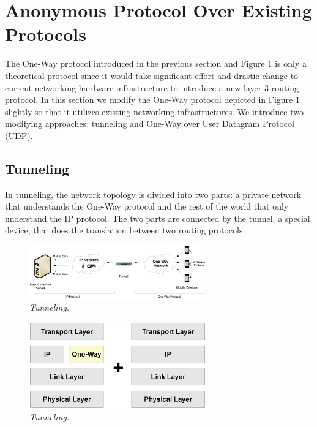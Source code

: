\section{Anonymous Protocol Over Existing Protocols}\label{sec-protocol}
The One-Way protocol introduced in the previous section and Figure 1 is only
a theoretical protocol since it would take significant effort and drastic
change to current networking hardware infrastructure to introduce a new layer 3
routing protocol. In this section we modify the One-Way protocol depicted in
Figure 1 slightly so that it utilizes existing networking infrastructures. We
introduce two modifying approaches: tunneling and One-Way over User Datagram
Protocol (UDP).

\subsection{Tunneling}

In tunneling, the network topology is divided into two parts: a private
network that understands the One-Way protocol and the rest of the world that
only understand the IP protocol. The two parts are connected by the tunnel,
a special device, that does the translation between two routing protocols.

\begin{figure}[h]
\begin{center}
\includegraphics[width=3in]{figure2.eps}
\caption{\small \sl Tunneling.\label{fig:Stupendous}}
\end{center}
\end{figure}

\begin{figure}[h]
\begin{center}
\includegraphics[width=3in]{figure2b.eps}
\caption{\small \sl Tunneling.\label{fig:Stupendous}}
\end{center}
\end{figure}

